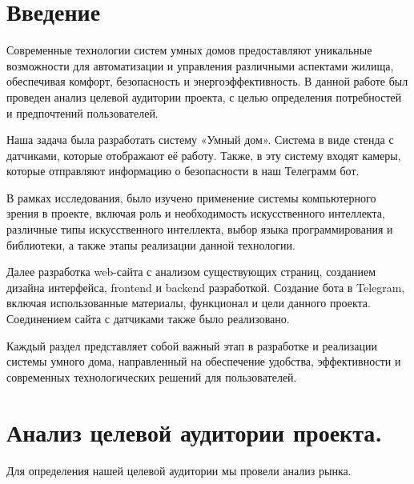 \chapter{Введение}

Современные технологии систем умных домов предоставляют уникальные возможности для автоматизации и управления различными аспектами жилища, обеспечивая комфорт, безопасность и энергоэффективность. В данной работе был проведен анализ целевой аудитории проекта, с целью определения потребностей и предпочтений пользователей. 

Наша задача была разработать систему «Умный дом».  Система в виде стенда с датчиками, которые отображают её работу. Также, в эту систему входят камеры, которые отправляют информацию о безопасности в наш Телеграмм бот. 

В рамках исследования,  было изучено применение системы компьютерного зрения в проекте, включая роль и необходимость искусственного интеллекта, различные типы искусственного  интеллекта, выбор языка программирования и библиотеки, а также этапы реализации данной технологии.

Далее разработка web-сайта с анализом существующих страниц, созданием дизайна интерфейса, frontend и backend разработкой. Создание бота в Telegram, включая использованные материалы, функционал и цели данного проекта. Соединением сайта с датчиками также было реализовано.

Каждый раздел представляет собой важный этап в разработке и реализации системы умного дома, направленный на обеспечение удобства, эффективности и современных технологических решений для пользователей.

\chapter{Анализ целевой аудитории проекта.}

Для определения нашей целевой аудитории мы провели анализ рынка.

